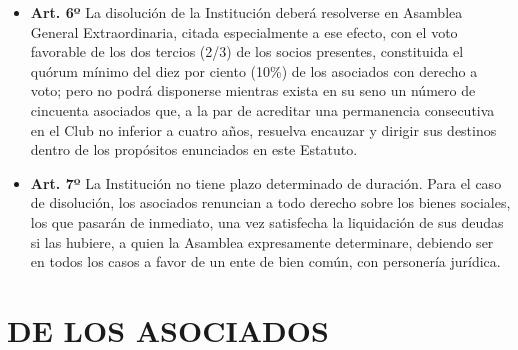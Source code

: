 \documentclass[]{book}
\providecommand{\tightlist}{%
  \setlength{\itemsep}{0pt}\setlength{\parskip}{0pt}}
\begin{document}
\begin{itemize}
\tightlist
\item
  \textbf{Art. 6º} La disolución de la Institución deberá resolverse en
  Asamblea General Extraordinaria, citada especialmente a ese efecto,
  con el voto favorable de los dos tercios (2/3) de los socios
  presentes, constituida el quórum mínimo del diez por ciento (10\%) de
  los asociados con derecho a voto; pero no podrá disponerse mientras
  exista en su seno un número de cincuenta asociados que, a la par de
  acreditar una permanencia consecutiva en el Club no inferior a cuatro
  años, resuelva encauzar y dirigir sus destinos dentro de los
  propósitos enunciados en este Estatuto.
\end{itemize}

\begin{itemize}
\tightlist
\item
  \textbf{Art. 7º} La Institución no tiene plazo determinado de
  duración. Para el caso de disolución, los asociados renuncian a todo
  derecho sobre los bienes sociales, los que pasarán de inmediato, una
  vez satisfecha la liquidación de sus deudas si las hubiere, a quien la
  Asamblea expresamente determinare, debiendo ser en todos los casos a
  favor de un ente de bien común, con personería jurídica.
\end{itemize}

\chapter{DE LOS ASOCIADOS}\label{de-los-asociados}
\end{document}
